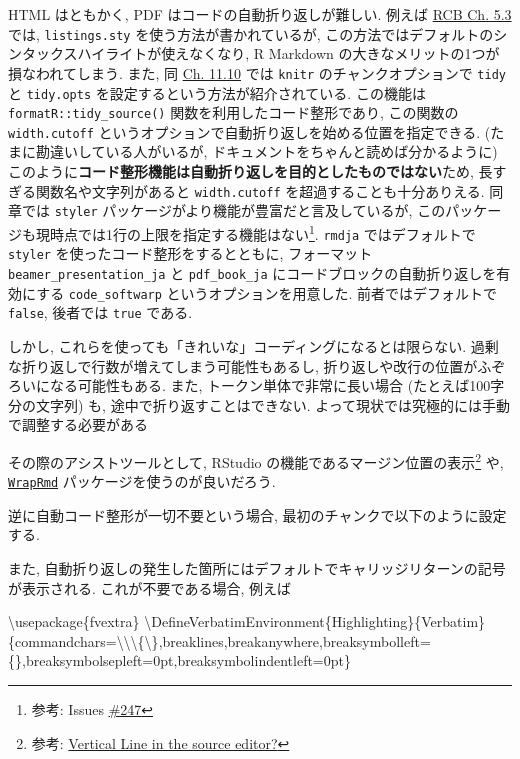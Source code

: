 \documentclass[
]{bxjsbook}
\newenvironment{Shaded}{\begin{snugshade}}{\end{snugshade}}
\newcommand{\BuiltInTok}[1]{#1}
\newcommand{\ExtensionTok}[1]{#1}
\newcommand{\FunctionTok}[1]{\textcolor[rgb]{0.00,0.00,0.00}{#1}}
\newcommand{\NormalTok}[1]{#1}
\theoremstyle{definition}
\theoremstyle{definition}
\theoremstyle{definition}
\theoremstyle{remark}
\begin{document}
HTML はともかく, PDF はコードの自動折り返しが難しい. 例えば
\href{https://bookdown.org/yihui/rmarkdown-cookbook/text-width.html}{RCB
Ch. 5.3} では, \texttt{listings.sty} を使う方法が書かれているが,
この方法ではデフォルトのシンタックスハイライトが使えなくなり, R Markdown
の大きなメリットの1つが損なわれてしまう. また, 同
\href{https://bookdown.org/yihui/rmarkdown-cookbook/opts-tidy.html}{Ch.
11.10} では \texttt{knitr} のチャンクオプションで \texttt{tidy} と
\texttt{tidy.opts} を設定するという方法が紹介されている. この機能は
\texttt{formatR::tidy\_source()} 関数を利用したコード整形であり,
この関数の \texttt{width.cutoff}
というオプションで自動折り返しを始める位置を指定できる.
(たまに勘違いしている人がいるが,
ドキュメントをちゃんと読めば分かるように)
このように\textbf{コード整形機能は自動折り返しを目的としたものではない}ため,
長すぎる関数名や文字列があると \texttt{width.cutoff}
を超過することも十分ありえる. 同章では \texttt{styler}
パッケージがより機能が豊富だと言及しているが,
このパッケージも現時点では1行の上限を指定する機能はない\footnote{参考:
  Issues \href{https://github.com/r-lib/styler/issues/247}{\#247}}.
\texttt{rmdja} ではデフォルトで \texttt{styler}
を使ったコード整形をするとともに, フォーマット
\texttt{beamer\_presentation\_ja} と \texttt{pdf\_book\_ja}
にコードブロックの自動折り返しを有効にする \texttt{code\_softwarp}
というオプションを用意した. 前者ではデフォルトで \texttt{false},
後者では \texttt{true} である.

しかし, これらを使っても「きれいな」コーディングになるとは限らない.
過剰な折り返しで行数が増えてしまう可能性もあるし,
折り返しや改行の位置がふぞろいになる可能性もある. また,
トークン単体で非常に長い場合 (たとえば100字分の文字列) も,
途中で折り返すことはできない.
よって現状では究極的には手動で調整する必要がある

その際のアシストツールとして, RStudio
の機能であるマージン位置の表示\footnote{参考:
  \href{https://community.rstudio.com/t/vertical-line-in-the-source-editor/24950}{Vertical
  Line in the source editor?}} や,
\href{https://github.com/tjmahr/WrapRmd}{\texttt{WrapRmd}}
パッケージを使うのが良いだろう.

逆に自動コード整形が一切不要という場合,
最初のチャンクで以下のように設定する.

また,
自動折り返しの発生した箇所にはデフォルトでキャリッジリターンの記号が表示される.
これが不要である場合, 例えば

\begin{Shaded}
\begin{Highlighting}[]
\BuiltInTok{\textbackslash{}usepackage}\NormalTok{\{}\ExtensionTok{fvextra}\NormalTok{\}}
\FunctionTok{\textbackslash{}DefineVerbatimEnvironment}\NormalTok{\{Highlighting\}\{Verbatim\}\{commandchars=}\FunctionTok{\textbackslash{}\textbackslash{}\textbackslash{}\{\textbackslash{}\}}\NormalTok{,breaklines,breakanywhere,breaksymbolleft=\{\},breaksymbolsepleft=0pt,breaksymbolindentleft=0pt\}}
\end{Highlighting}
\end{Shaded}
\end{document}

